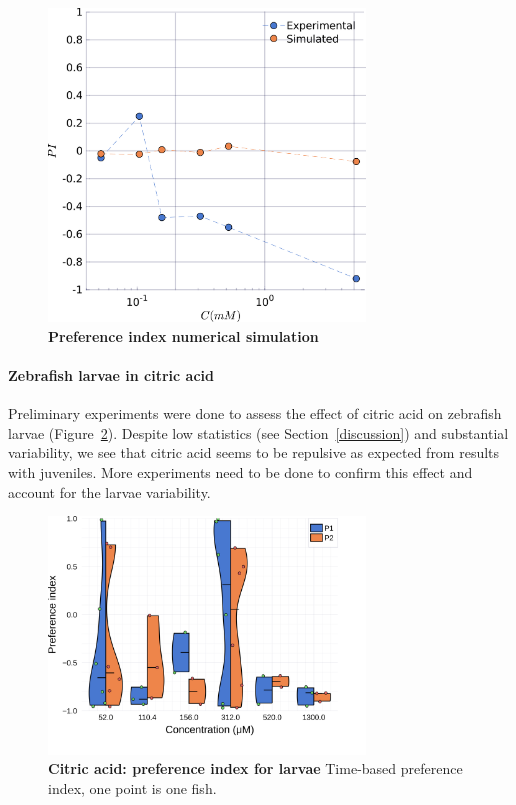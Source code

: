       \begin{figure}[h!]
        \centering
        \includegraphics[width=0.75\textwidth]{part_2/assets/simu_pi.png}
        \caption{\textbf{Preference index numerical simulation}}
        \label{simu_pi}
      \end{figure}


  \paragraph{Zebrafish larvae in citric acid} Preliminary experiments were done to assess the effect of citric acid on zebrafish larvae (Figure~\ref{dist_citric_acid_lar}). Despite low statistics (see Section~\ref{discussion}) and substantial variability, we see that citric acid seems to be repulsive as expected from results with juveniles. More experiments need to be done to confirm this effect and account for the larvae variability.

    \begin{figure}[h!]
      \centering
      \includegraphics[width=0.75\textwidth]{part_2/assets/dist_citricacid_lar.png}
      \caption{\textbf{Citric acid: preference index for larvae} Time-based preference index, one point is one fish.}
      \label{dist_citric_acid_lar}
    \end{figure}

